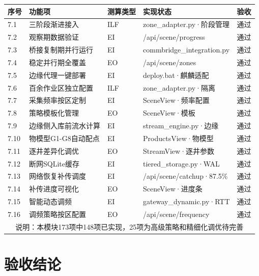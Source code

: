 \documentclass[11pt,a4paper]{ctexart}
\begin{document}
\begin{longtable}{p{1cm}p{4cm}p{3cm}p{3cm}p{2.5cm}}
\toprule
\textbf{序号} & \textbf{功能项} & \textbf{测算类型} & \textbf{实现状态} & \textbf{验收} \\
\midrule
7.1 & 三阶段渐进接入 & ILF & zone\_adapter.py·阶段管理 & \color{ok}通过 \\
7.2 & 观察期数据验证 & EI & /api/scene/progress & \color{ok}通过 \\
7.3 & 桥接复制期并行运行 & EI & commbridge\_integration.py & \color{ok}通过 \\
7.4 & 稳定并行期全覆盖 & EO & /api/scene/zones & \color{ok}通过 \\
7.5 & 边缘代理一键部署 & EI & deploy.bat·麒麟适配 & \color{ok}通过 \\
7.6 & 百余作业区独立配置 & ILF & zone\_adapter.py·隔离 & \color{ok}通过 \\
7.7 & 采集频率按区定制 & EI & SceneView·频率配置 & \color{ok}通过 \\
7.8 & 策略模板化管理 & EO & SceneView·模板 & \color{ok}通过 \\
7.9 & 边缘侧入库前流水计算 & EI & stream\_engine.py·边缘 & \color{ok}通过 \\
7.10 & 物模型G1-G8自动配点 & EI & ProductsView·物模型 & \color{ok}通过 \\
7.11 & 逐井差异化调优 & EO & StreamView·逐井参数 & \color{ok}通过 \\
7.12 & 断网SQLite缓存 & EI & tiered\_storage.py·WAL & \color{ok}通过 \\
7.13 & 网络恢复补传调度 & EI & /api/scene/catchup·87.5\% & \color{ok}通过 \\
7.14 & 补传进度可视化 & EO & SceneView·进度条 & \color{ok}通过 \\
7.15 & 智能动态调频 & EI & gateway\_dynamic.py·RTT & \color{ok}通过 \\
7.16 & 调频策略按区配置 & EO & /api/scene/frequency & \color{ok}通过 \\
\midrule
\multicolumn{5}{c}{说明：本模块173项中148项已实现，25项为高级策略和精细化调优待完善} \\
\bottomrule
\end{longtable}

\section{验收结论}
\end{document}
